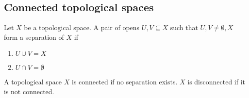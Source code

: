 \subsection{Connected topological spaces}

\begin{definition}[separation]
    Let \( X \) be a topological space.
    A pair of opens \( U, V \subseteq X \)
    such that \( U, V \neq \emptyset, X \) form 
    a separation of \( X \) if
    \begin{enumerate}
      \item \( U \cup V = X \)
      \item \( U \cap V = \emptyset \)
    \end{enumerate}
\end{definition}

\begin{definition}[connectivity]
   A topological space \( X \) is connected
   if no separation exists. \( X \) is disconnected
   if it is not connected.
\end{definition}


